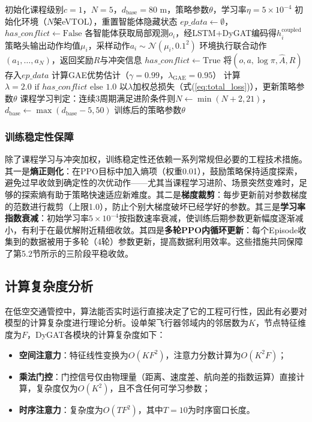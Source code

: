 \documentclass[12pt,a4paper,UTF8]{ctexart}
\begin{document}
\begin{algorithm}[H]
\caption{基于DyGAT-MARL的协同管控模型训练流程}
\label{alg:training}
\begin{algorithmic}[1]
\STATE 初始化课程级别$c=1$，$N=5$，$d_{\text{base}}=80$ m，策略参数$\theta$，学习率$\eta=5\times10^{-4}$
    \STATE 初始化环境（$N$架eVTOL），重置智能体隐藏状态
    \STATE $ep\_data \leftarrow \emptyset$，$has\_conflict \leftarrow \text{False}$
    \REPEAT
        \STATE 各智能体获取局部观测$o_i$，经LSTM+DyGAT编码得$h_i^{\text{coupled}}$
        \STATE 策略头输出动作均值$\mu_i$，采样动作$a_i\sim\mathcal{N}(\mu_i,0.1^2)$
        \STATE 环境执行联合动作$(a_1,\ldots,a_N)$，返回奖励$R$与冲突信息
         \STATE $has\_conflict \leftarrow \text{True}$ \ENDIF
        \STATE 将$(o,a,\log\pi,\hat{A},R)$存入$ep\_data$
    \STATE 计算GAE\cite{ref38}优势估计（$\gamma=0.99$，$\lambda_{\text{GAE}}=0.95$）
    \STATE 计算$\lambda = 2.0 \text{ if } has\_conflict \text{ else } 1.0$
    \STATE 以$\lambda$加权总损失（式(\ref{eq:total_loss})），更新策略参数$\theta$
    \STATE 课程学习判定：连续3周期满足进阶条件则$N\leftarrow\min(N+2,21)$，$d_{\text{base}}\leftarrow\max(d_{\text{base}}-5,50)$
\ENDFOR
\STATE \RETURN 训练后的策略参数$\theta$
\end{algorithmic}
\end{algorithm}

\subsubsection{训练稳定性保障}

除了课程学习与冲突加权，训练稳定性还依赖一系列常规但必要的工程技术措施。其一是\textbf{熵正则化}：在PPO目标中加入熵项（权重0.01），鼓励策略保持适度探索，避免过早收敛到确定性的次优动作——尤其当课程学习进阶、场景突然变难时，足够的探索熵有助于策略快速适应新难度。其二是\textbf{梯度裁剪}：每步更新前对参数梯度的范数进行裁剪（上限1.0），防止个别大梯度破坏已经学好的参数。其三是\textbf{学习率指数衰减}：初始学习率$5\times10^{-4}$按指数速率衰减，使训练后期参数更新幅度逐渐减小，有利于在最优解附近精细收敛。其四是\textbf{多轮PPO内循环更新}：每个Episode收集到的数据被用于多轮（4轮）参数更新，提高数据利用效率。这些措施共同保障了第5.2节所示的三阶段平稳收敛。

\subsection{计算复杂度分析}

在低空交通管控中，算法能否实时运行直接决定了它的工程可行性，因此有必要对模型的计算复杂度进行理论分析。设单架飞行器邻域内的邻居数为$K$，节点特征维度为$F$，DyGAT各模块的计算复杂度如下：
\begin{itemize}
    \item \textbf{空间注意力}：特征线性变换为$O(KF^2)$，注意力分数计算为$O(K^2F)$；
    \item \textbf{乘法门控}：门控信号仅由物理量（距离、速度差、航向差的指数运算）直接计算，复杂度仅为$O(K^2)$，且不含任何可学习参数；
    \item \textbf{时序注意力}：复杂度为$O(TF^2)$，其中$T=10$为时序窗口长度。
\end{itemize}
\end{document}
